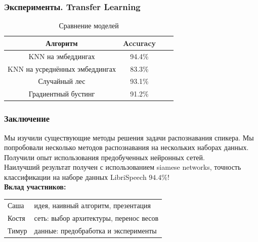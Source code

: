 \documentclass[11pt]{beamer}
\begin{document}
\begin{frame}
\frametitle{Эксперименты. Transfer Learning}

\begin{table}[h!]
\begin{center}

\begin{tabular}{|c|c|c|c|}
\hline
	Алгоритм & Accuracy \\
\hline
	KNN на эмбеддингах & 94.4\% \\
\hline
	KNN на усреднённых эмбеддингах & 83.3\% \\
\hline
	Случайный лес & 93.1\% \\
\hline
	Градиентный бустинг & 91.2\% \\
\hline
\end{tabular}
\caption{Сравнение моделей}
\end{center}
\end{table}
\end{frame}


\begin{frame}
\frametitle{Заключение}
Мы изучили существующие методы решения задачи распознавания спикера. Мы попробовали несколько методов распознавания на нескольких наборах данных. Получили опыт использования предобученных нейронных сетей. \\
\vspace{1em}
Наилучший результат получен с использованием siamese networks, точность классификации на наборе данных LibriSpeech $ 94.4 \%$!\\
\vfill
\textbf{Вклад участников:}
\begin{tabular}{ll}
Саша & идея, наивный алгоритм, презентация \\
Костя & сеть: выбор архитектуры, перенос весов \\
Тимур & данные: предобработка и эксперименты
\end{tabular}
\end{frame}
\end{document}
